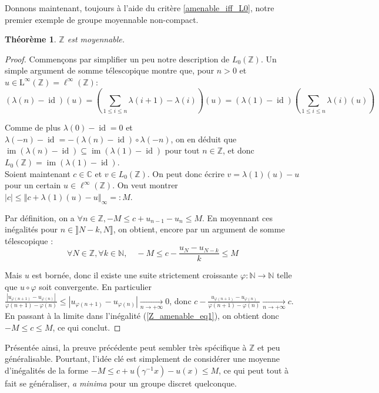 \documentclass[a4paper,12pt]{article}
\newtheorem{theorem}{Théorème}[section]
\newcommand{\N}{\mathbb{N}}
\newcommand{\Z}{\mathbb{Z}}
\newcommand{\C}{\mathbb{C}}
\newcommand{\norm}[1]{\left\Vert #1\right\Vert}
\newcommand{\abs}[1]{\left\vert#1\right\vert}
\newcommand{\inv}{^{-1}}
\newcommand{\comp}{\circ}
\DeclareMathOperator{\id}{id}
\DeclareMathOperator{\Ima}{im}
\begin{document}
Donnons maintenant, toujours à l'aide du critère \ref{amenable_iff_L0}, notre premier exemple de groupe moyennable non-compact.

\begin{theorem}\label{Z_amenable}
    $\Z$ est moyennable.
\end{theorem}

\begin{proof}
    Commençons par simplifier un peu notre description de $L_0(\Z)$. Un simple argument de somme
    télescopique montre que, pour $n>0$ et $u\in \mathrm{L}^\infty(\Z)=\ell^\infty(\Z)$:
    \begin{equation*}
        (\lambda(n)-\id)(u) = \left(\sum_{1\le i\le n} \lambda(i+1) - \lambda(i)\right)(u) = (\lambda(1)-\id)\left(\sum_{1\le i\le n} \lambda(i)(u)\right)
    \end{equation*}

    Comme de plus $\lambda(0)-\id = 0$ et $\lambda(-n)-\id = -(\lambda(n)-\id)\comp\lambda(-n)$,
    on en déduit que $\Ima(\lambda(n)-\id)\subseteq\Ima(\lambda(1)-\id)$ pour tout $n\in\Z$, et donc $L_0(\Z) = \Ima(\lambda(1)-\id)$. \\

    Soient maintenant $c\in\C$ et $v\in L_0(\Z)$. On peut donc écrire $v = \lambda(1)(u)-u$ pour un certain $u\in\ell^\infty(\Z)$. 
    On veut montrer $\abs{c}\le\norm{c + \lambda(1)(u) - u}_\infty =: M$. 

    Par définition, on a $\forall n\in\Z, -M\le c+u_{n-1}-u_n\le M$. En moyennant ces inégalités pour 
    $n\in\rrbracket N-k, N\rrbracket$, on obtient, encore par un argument de somme télescopique :
    \begin{equation}\label{Z_amenable_eq1}
        \forall N\in\Z, \forall k\in\N,\quad -M\le c-\frac{u_N - u_{N-k}}{k} \le M
    \end{equation}

    Mais $u$ est bornée, donc il existe une suite strictement croissante $\varphi:\N\to\N$ telle que $u\comp\varphi$
    soit convergente. En particulier $\frac{\abs{u_{\varphi(n+1)}-u_{\varphi(n)}}}{\varphi(n+1)-\varphi(n)}\le\abs{u_{\varphi(n+1)}-u_{\varphi(n)}}\xrightarrow[n\to+\infty]{}0$, 
    donc $c-\frac{u_{\varphi(n+1)}-u_{\varphi(n)}}{\varphi(n+1)-\varphi(n)}\xrightarrow[n\to+\infty]{}c$. En passant à la limite dans l'inégalité (\ref{Z_amenable_eq1}),
    on obtient donc $-M\le c\le M$, ce qui conclut.
\end{proof}

Présentée ainsi, la preuve précédente peut sembler très spécifique à $\Z$ et peu généralisable. Pourtant, l'idée clé 
est simplement de considérer une \og{}moyenne\fg{} d'inégalités de la forme $-M\le c + u(\gamma\inv x) - u(x)\le M$, 
ce qui peut tout à fait se généraliser, \emph{a minima} pour un groupe discret quelconque. 
\end{document}
